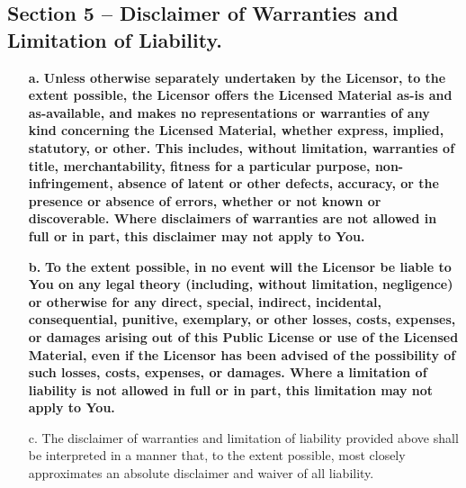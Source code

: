 \subsection*{Section 5 – Disclaimer of Warranties and Limitation of Liability.}
\begin{itemize}
\item[\textbf{a.}] \textbf{Unless otherwise separately undertaken by the Licensor, to the extent possible, the Licensor offers the Licensed Material as-is and as-available, and makes no representations or warranties of any kind concerning the Licensed Material, whether express, implied, statutory, or other. This includes, without limitation, warranties of title, merchantability, fitness for a particular purpose, non-infringement, absence of latent or other defects, accuracy, or the presence or absence of errors, whether or not known or discoverable. Where disclaimers of warranties are not allowed in full or in part, this disclaimer may not apply to You.}
\item[\textbf{b.}] \textbf{To the extent possible, in no event will the Licensor be liable to You on any legal theory (including, without limitation, negligence) or otherwise for any direct, special, indirect, incidental, consequential, punitive, exemplary, or other losses, costs, expenses, or damages arising out of this Public License or use of the Licensed Material, even if the Licensor has been advised of the possibility of such losses, costs, expenses, or damages. Where a limitation of liability is not allowed in full or in part, this limitation may not apply to You.}
\item[c.] The disclaimer of warranties and limitation of liability provided above shall be interpreted in a manner that, to the extent possible, most closely approximates an absolute disclaimer and waiver of all liability.
\end{itemize}

